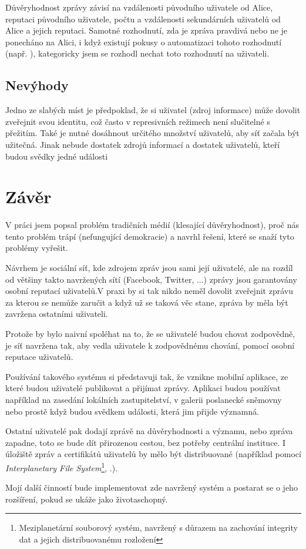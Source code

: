 \documentclass[12pt,a4paper]{report}
\begin{document}
Důvěryhodnost zprávy závisí na vzdálenosti původního uživatele od Alice, reputaci původního uživatele, počtu a vzdálenosti sekundárních uživatelů od Alice a jejich reputaci. Samotné rozhodnutí, zda je zpráva pravdivá nebo ne je ponecháno na Alici, i když existují pokusy o automatizaci tohoto rozhodnutí (např. \cite{giasemidis16}), kategoricky jsem se rozhodl nechat toto rozhodnutí na uživateli.

\section{Nevýhody}
\label{sec:nevyhody}
Jedno ze slabých míst je předpoklad, že si uživatel (zdroj informace) může dovolit zveřejnit svou identitu, což často v represivních režimech není slučitelné s přežitím.
Také je nutné dosáhnout určitého množství uživatelů, aby síť začala být užitečná. Jinak nebude dostatek zdrojů informací a dostatek uživatelů, kteří budou svědky jedné události

\chapter{Závěr}
\label{ch:zaver}

V práci jsem popsal problém tradičních médií (klesající důvěryhodnost), proč nás tento problém trápí (nefungující demokracie) a navrhl řešení, které se snaží tyto problémy vyřešit.

Návrhem je sociální síť, kde zdrojem zpráv jsou sami její uživatelé, ale na rozdíl od většiny takto navržených sítí (Facebook, Twitter, ...) zprávy jsou garantovány osobní reputací uživatelů.V praxi by si tak nikdo neměl dovolit zveřejnit zprávu za kterou se nemůže zaručit a když už se taková věc stane, zpráva by měla být zavržena ostatními uživateli.

Protože by bylo naivní spoléhat na to, že se uživatelé budou chovat zodpovědně, je síť navržena tak, aby vedla uživatele k zodpovědnému chování, pomocí osobní reputace uživatelů.

Používání takového systému si představuji tak, že vznikne mobilní aplikace, ze které budou uživatelé publikovat a přijímat zprávy. Aplikaci budou používat například na zasedání lokálních zastupitelství, v galerii poslanecké sněmovny nebo prostě když budou svědkem události, která jim přijde významná.

Ostatní uživatelé pak dodají zprávě na důvěryhodnosti a významu, nebo zpráva zapadne, toto se bude dít přirozenou cestou, bez potřeby centrální instituce. I úložiště zpráv a certifikátů uživatelů by mělo být distribuované (například pomocí \textit{Interplanetary File System}\footnote{Meziplanetární souborový systém, navržený s důrazem na zachování integrity dat a jejich distribuovanému rozložení}, \cite{benet14}.).

Mojí další činností bude implementovat zde navržený systém a postarat se o jeho rozšíření, pokud se ukáže jako životaschopný.

\printglossaries
\printbibliography[heading=bibintoc]
\end{document}
